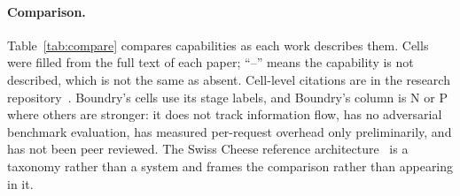 \documentclass[11pt,a4paper]{article}
\begin{document}
\paragraph{Comparison.} Table~\ref{tab:compare} compares capabilities as each work describes them. Cells were filled from the full text of each paper; ``--'' means the capability is not described, which is not the same as absent. Cell-level citations are in the research repository~\citep{boundryresearch}. Boundry's cells use its stage labels, and Boundry's column is N or P where others are stronger: it does not track information flow, has no adversarial benchmark evaluation, has measured per-request overhead only preliminarily, and has not been peer reviewed. The Swiss Cheese reference architecture~\citep{shamsujjoha2025swiss} is a taxonomy rather than a system and frames the comparison rather than appearing in it.
\end{document}
